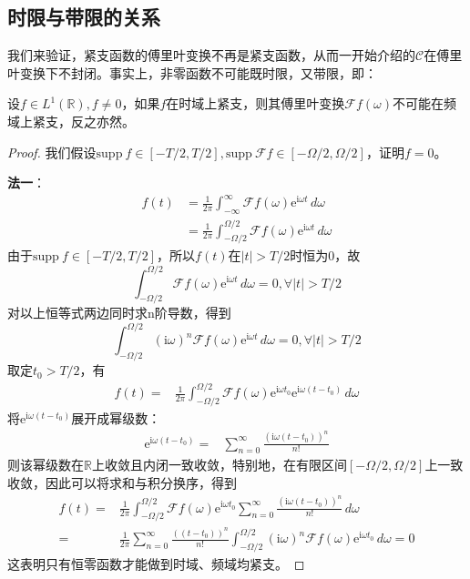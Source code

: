 \subsection{时限与带限的关系}\label{sub:time_freq_limit}
我们来验证，紧支函数的傅里叶变换不再是紧支函数，从而一开始介绍的$\mathcal{C} $在傅里叶变换下不封闭。事实上，非零函数不可能既时限，又带限，即：\begin{theorem}
设$f\in L^1(\mathbb{R}),f\neq 0$，如果$f$在时域上紧支，则其傅里叶变换$\mathcal{F} f(\omega)$不可能在频域上紧支，反之亦然。
    
\end{theorem}

\begin{proof}
我们假设$\text{supp}\ f\in[-T/2,T/2],\text{supp}\ \mathcal{F} f\in[-\Omega/2,\Omega/2]$，证明$f=0$。

\textbf{法一}：
\begin{align*}
    f(t)&=\frac{1}{2\pi}\int_{-\infty}^{\infty}\mathcal{F} f(\omega)\mathrm{e}^{\mathrm{i}\omega t}\,d\omega\\
    &=\frac{1}{2\pi}\int_{-\Omega/2}^{\Omega/2}\mathcal{F} f(\omega)\mathrm{e}^{\mathrm{i}\omega t}\,d\omega
\end{align*}
由于$\text{supp}\ f\in[-T/2,T/2]$，所以$f(t)$在$|t|>T/2$时恒为0，故\[\int_{-\Omega/2}^{\Omega/2}\mathcal{F} f(\omega)\mathrm{e}^{\mathrm{i}\omega t}\,d\omega=0,\forall |t|>T/2\]
对以上恒等式两边同时求n阶导数，得到\[\int_{-\Omega/2}^{\Omega/2}(\mathrm{i}\omega)^n \mathcal{F} f(\omega)\mathrm{e}^{\mathrm{i}\omega t}\,d\omega=0,\forall |t|>T/2\]
取定$t_0>T/2$，有\begin{align*}
    f(t)=&\frac{1}{2\pi}\int_{-\Omega/2}^{\Omega/2}\mathcal{F} f(\omega)\mathrm{e}^{\mathrm{i}\omega t_0}\mathrm{e}^{\mathrm{i}\omega (t-t_0)}\,d\omega
\end{align*}
将$\mathrm{e}^{\mathrm{i}\omega (t-t_0)}$展开成幂级数：\begin{align*}
    \mathrm{e}^{\mathrm{i}\omega (t-t_0)}=&\sum_{n=0}^{\infty}\frac{(\mathrm{i}\omega (t-t_0))^n}{n!}
\end{align*}
则该幂级数在$\mathbb{R}$上收敛且内闭一致收敛，特别地，在有限区间$[-\Omega/2,\Omega/2]$上一致收敛，因此可以将求和与积分换序，得到\begin{align*}
    f(t)=&\frac{1}{2\pi}\int_{-\Omega/2}^{\Omega/2}\mathcal{F} f(\omega)\mathrm{e}^{\mathrm{i}\omega t_0}\sum_{n=0}^{\infty}\frac{(\mathrm{i}\omega (t-t_0))^n}{n!}\,d\omega\\
    =&\frac{1}{2\pi}\sum_{n=0}^{\infty}\frac{((t-t_0))^n}{n!}\int_{-\Omega/2}^{\Omega/2}(\mathrm{i}\omega)^n \mathcal{F} f(\omega)\mathrm{e}^{\mathrm{i}\omega t_0}\,d\omega=0
\end{align*}
这表明只有恒零函数才能做到时域、频域均紧支。


\end{proof}
